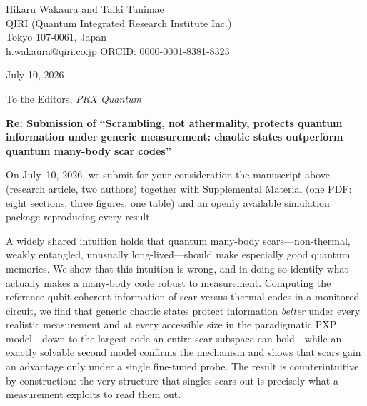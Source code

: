 \documentclass[11pt]{article}
\begin{document}
\pagestyle{empty}

\noindent Hikaru Wakaura and Taiki Tanimae\\
QIRI (Quantum Integrated Research Institute Inc.)\\
Tokyo 107-0061, Japan\\
\href{mailto:h.wakaura@qiri.co.jp}{h.wakaura@qiri.co.jp} \quad ORCID: 0000-0001-8381-8323

\vspace{1em}
\noindent July 10, 2026

\vspace{1em}
\noindent To the Editors, \emph{PRX Quantum}

\vspace{1em}

\noindent \textbf{Re: Submission of ``Scrambling, not athermality, protects
quantum information under generic measurement: chaotic states outperform
quantum many-body scar codes''}

\vspace{0.5em}

On July~10, 2026, we submit for your consideration the manuscript above (research
article, two authors) together with Supplemental Material (one PDF: eight
sections, three figures, one table) and an openly available simulation package
reproducing every result.

\vspace{0.5em}

A widely shared intuition holds that quantum many-body scars---non-thermal,
weakly entangled, unusually long-lived---should make especially good quantum
memories. We show that this intuition is wrong, and in doing so identify what
actually makes a many-body code robust to measurement. Computing the
reference-qubit coherent information of scar versus thermal codes in a monitored
circuit, we find that generic chaotic states protect information \emph{better}
under every realistic measurement and at every accessible size in the
paradigmatic PXP model---down to the largest code an entire scar subspace can
hold---while an exactly solvable second model confirms the mechanism and shows
that scars gain an advantage only under a single fine-tuned probe. The result
is counterintuitive by construction: the very structure that singles scars out
is precisely what a measurement exploits to read them out.
\end{document}
